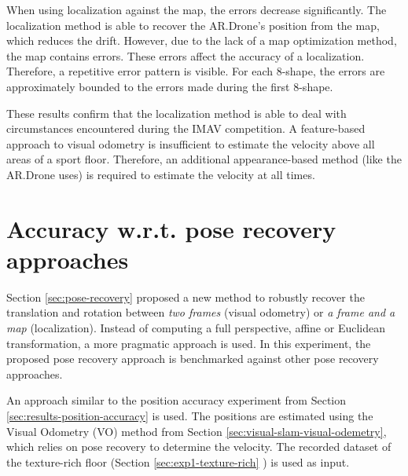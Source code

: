 When using localization against the map, the errors decrease significantly.
The localization method is able to recover the AR.Drone's position from the map, which reduces the drift.
However, due to the lack of a map optimization method, the map contains errors.
These errors affect the accuracy of a localization.
Therefore, a repetitive error pattern is visible.
For each 8-shape, the errors are approximately bounded to the errors made during the first 8-shape.

These results confirm that the localization method is able to deal with circumstances encountered during the IMAV competition.
A feature-based approach to visual odometry is insufficient to estimate the velocity above all areas of a sport floor.
Therefore, an additional appearance-based method (like the AR.Drone uses) is required to estimate the velocity at all times.


\clearpage
\section{Accuracy w.r.t. pose recovery approaches}
\label{sec:results-pose-recovery}
Section \ref{sec:pose-recovery} proposed a new method to robustly recover the translation and rotation between \textit{two frames} (visual odometry) or \textit{a frame and a map} (localization).
Instead of computing a full perspective, affine or Euclidean transformation, a more pragmatic approach is used.
In this experiment, the proposed pose recovery approach is benchmarked against other pose recovery approaches.

An approach similar to the position accuracy experiment from Section \ref{sec:results-position-accuracy} is used.
The positions are estimated using the Visual Odometry (VO) method from Section \ref{sec:visual-slam-visual-odemetry}, which relies on pose recovery to determine the velocity.
The recorded dataset of the texture-rich floor (Section \ref{sec:exp1-texture-rich} ) is used as input.
 
